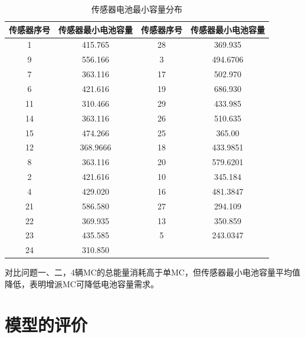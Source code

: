 \documentclass{whutmod}
\begin{document}
            \begin{table}[H]
                \centering
                \caption{传感器电池最小容量分布}\label{adfs}
                \begin{tabular}{cccc}
                    \toprule[2pt]
                    \multicolumn{1}{m{2.5cm}}{\centering 传感器序号} &
                    \multicolumn{1}{m{4.5cm}}{\centering 传感器最小电池容量} &
                    \multicolumn{1}{m{2.5cm}}{\centering 传感器序号} &
                    \multicolumn{1}{m{4.5cm}}{\centering 传感器最小电池容量} \\
                    \midrule[1pt]
                    1 & 415.765 & 28 & 369.935 \\
                    9 & 556.166 & 3 & 494.6706 \\
                    7 & 363.116 & 17 & 502.970 \\
                    6 & 421.616 & 19 & 686.930 \\
                    11 & 310.466 & 29 & 433.985 \\
                    14 & 363.116 & 26 & 510.635 \\
                    15 & 474.266 & 25 & 365.00 \\
                    12 & 368.9666 & 18 & 433.9851 \\
                    8 & 363.116 & 20 & 579.6201 \\
                    2 & 421.616 & 10 & 345.184 \\
                    4 & 429.020 & 16 & 481.3847 \\
                    21 & 586.580 & 27 & 294.109 \\
                    22 & 369.935 & 13 & 350.859 \\
                    23 & 435.585 & 5 & 243.0347 \\
                    24 & 310.850 & & \\
                    \bottomrule[2pt]
                \end{tabular}
            \end{table}

            对比问题一、二，4辆MC的总能量消耗高于单MC，但传感器最小电池容量平均值降低，表明增派MC可降低电池容量需求。

    \section{模型的评价}
\end{document}
